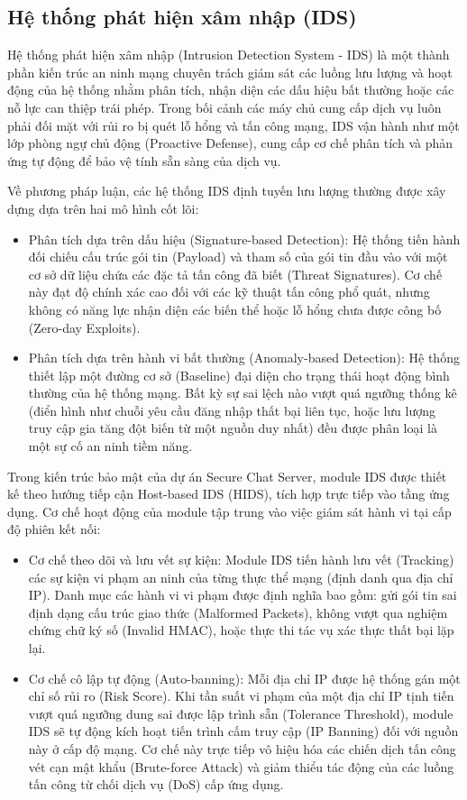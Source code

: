 \subsection{Hệ thống phát hiện xâm nhập (IDS)}

Hệ thống phát hiện xâm nhập (Intrusion Detection System - IDS) là một thành phần kiến trúc an ninh mạng chuyên trách giám sát các luồng lưu lượng và hoạt động của hệ thống nhằm phân tích, nhận diện các dấu hiệu bất thường hoặc các nỗ lực can thiệp trái phép. Trong bối cảnh các máy chủ cung cấp dịch vụ luôn phải đối mặt với rủi ro bị quét lỗ hổng và tấn công mạng, IDS vận hành như một lớp phòng ngự chủ động (Proactive Defense), cung cấp cơ chế phân tích và phản ứng tự động để bảo vệ tính sẵn sàng của dịch vụ.

Về phương pháp luận, các hệ thống IDS định tuyến lưu lượng thường được xây dựng dựa trên hai mô hình cốt lõi:
\begin{itemize}[label={-}]
    \item Phân tích dựa trên dấu hiệu (Signature-based Detection): Hệ thống tiến hành đối chiếu cấu trúc gói tin (Payload) và tham số của gói tin đầu vào với một cơ sở dữ liệu chứa các đặc tả tấn công đã biết (Threat Signatures). Cơ chế này đạt độ chính xác cao đối với các kỹ thuật tấn công phổ quát, nhưng không có năng lực nhận diện các biến thể hoặc lỗ hổng chưa được công bố (Zero-day Exploits).
    \item Phân tích dựa trên hành vi bất thường (Anomaly-based Detection): Hệ thống thiết lập một đường cơ sở (Baseline) đại diện cho trạng thái hoạt động bình thường của hệ thống mạng. Bất kỳ sự sai lệch nào vượt quá ngưỡng thống kê (điển hình như chuỗi yêu cầu đăng nhập thất bại liên tục, hoặc lưu lượng truy cập gia tăng đột biến từ một nguồn duy nhất) đều được phân loại là một sự cố an ninh tiềm năng.
\end{itemize}

Trong kiến trúc bảo mật của dự án Secure Chat Server, module IDS được thiết kế theo hướng tiếp cận Host-based IDS (HIDS), tích hợp trực tiếp vào tầng ứng dụng. Cơ chế hoạt động của module tập trung vào việc giám sát hành vi tại cấp độ phiên kết nối:
\begin{itemize}[label={-}]
    \item Cơ chế theo dõi và lưu vết sự kiện: Module IDS tiến hành lưu vết (Tracking) các sự kiện vi phạm an ninh của từng thực thể mạng (định danh qua địa chỉ IP). Danh mục các hành vi vi phạm được định nghĩa bao gồm: gửi gói tin sai định dạng cấu trúc giao thức (Malformed Packets), không vượt qua nghiệm chứng chữ ký số (Invalid HMAC), hoặc thực thi tác vụ xác thực thất bại lặp lại.
    \item Cơ chế cô lập tự động (Auto-banning): Mỗi địa chỉ IP được hệ thống gán một chỉ số rủi ro (Risk Score). Khi tần suất vi phạm của một địa chỉ IP tịnh tiến vượt quá ngưỡng dung sai được lập trình sẵn (Tolerance Threshold), module IDS sẽ tự động kích hoạt tiến trình cấm truy cập (IP Banning) đối với nguồn này ở cấp độ mạng. Cơ chế này trực tiếp vô hiệu hóa các chiến dịch tấn công vét cạn mật khẩu (Brute-force Attack) và giảm thiểu tác động của các luồng tấn công từ chối dịch vụ (DoS) cấp ứng dụng.
\end{itemize}
